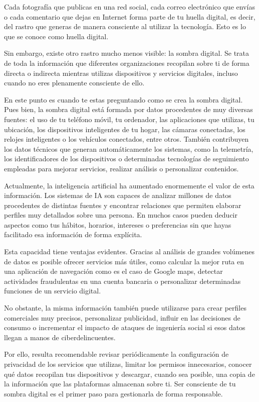 \documentclass[
  spanish,
  a4paper,
  openany]{book}
\begin{document}
Cada fotografía que publicas en una red social, cada correo electrónico que envías o cada comentario que dejas en Internet forma parte de tu huella digital, es decir, del rastro que generas de manera consciente al utilizar la tecnología. Esto es lo que se conoce como huella digital.

Sin embargo, existe otro rastro mucho menos visible: la sombra digital. Se trata de toda la información que diferentes organizaciones recopilan sobre ti de forma directa o indirecta mientras utilizas dispositivos y servicios digitales, incluso cuando no eres plenamente consciente de ello.

En este punto es cuando te estas preguntando como se crea la sombra digital. Pues bien, la sombra digital está formada por datos procedentes de muy diversas fuentes: el uso de tu teléfono móvil, tu ordenador, las aplicaciones que utilizas, tu ubicación, los dispositivos inteligentes de tu hogar, las cámaras conectadas, los relojes inteligentes o los vehículos conectados, entre otros. También contribuyen los datos técnicos que generan automáticamente los sistemas, como la telemetría, los identificadores de los dispositivos o determinadas tecnologías de seguimiento empleadas para mejorar servicios, realizar análisis o personalizar contenidos.

Actualmente, la inteligencia artificial ha aumentado enormemente el valor de esta información. Los sistemas de IA son capaces de analizar millones de datos procedentes de distintas fuentes y encontrar relaciones que permiten elaborar perfiles muy detallados sobre una persona. En muchos casos pueden deducir aspectos como tus hábitos, horarios, intereses o preferencias sin que hayas facilitado esa información de forma explícita.

Esta capacidad tiene ventajas evidentes. Gracias al análisis de grandes volúmenes de datos es posible ofrecer servicios más útiles, como calcular la mejor ruta en una aplicación de navegación como es el caso de Google maps, detectar actividades fraudulentas en una cuenta bancaria o personalizar determinadas funciones de un servicio digital.

No obstante, la misma información también puede utilizarse para crear perfiles comerciales muy precisos, personalizar publicidad, influir en las decisiones de consumo o incrementar el impacto de ataques de ingeniería social si esos datos llegan a manos de ciberdelincuentes.

Por ello, resulta recomendable revisar periódicamente la configuración de privacidad de los servicios que utilizas, limitar los permisos innecesarios, conocer qué datos recopilan tus dispositivos y descargar, cuando sea posible, una copia de la información que las plataformas almacenan sobre ti. Ser consciente de tu sombra digital es el primer paso para gestionarla de forma responsable.
\end{document}
